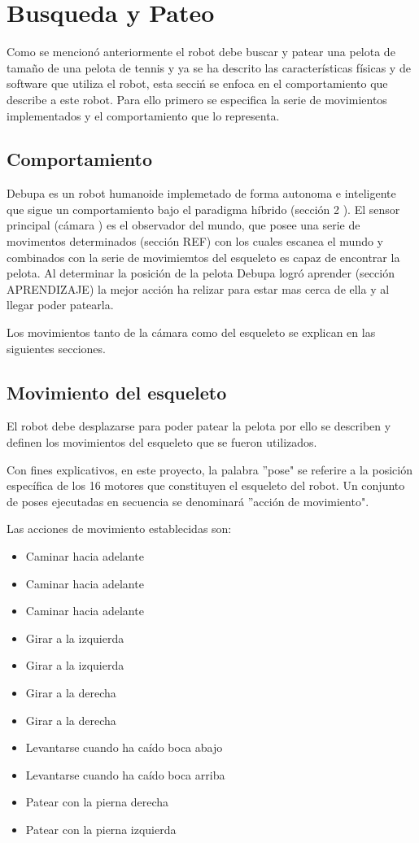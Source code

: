 \section{Busqueda y Pateo}
Como se mencion\'o anteriormente el robot debe buscar y patear una pelota de tamaño de una pelota de tennis y ya se ha descrito las caracter\'isticas f\'isicas y de software que utiliza el robot, esta secci\'n se enfoca en el comportamiento que describe a este robot.
 Para ello primero se especifica la serie de movimientos implementados y el comportamiento que lo representa.

\subsection{Comportamiento}

Debupa es un robot humanoide implemetado de forma autonoma e inteligente que sigue un comportamiento bajo el paradigma h\'ibrido (secci\'on 2 ). El sensor principal (c\'amara ) es el observador del mundo, que posee una serie de movimentos determinados (secci\'on REF) con los cuales escanea el mundo y combinados con la serie de movimiemtos del esqueleto es capaz de encontrar la pelota. Al determinar la posici\'on de la pelota Debupa logr\'o aprender (secci\'on APRENDIZAJE) la mejor acci\'on ha relizar para estar mas cerca de ella y al llegar poder patearla.

Los movimientos tanto de la c\'amara como del esqueleto se explican en las siguientes secciones.  

\subsection{Movimiento del esqueleto}
\label{esqueleto}
El robot debe desplazarse para poder patear la pelota por ello se describen y definen los movimientos del esqueleto que se fueron utilizados.

Con fines explicativos, en este proyecto, la palabra ''pose" se referire a la posición específica de los 16 motores que constituyen el esqueleto del robot. Un conjunto de poses ejecutadas en secuencia se denominará ''acción de movimiento".


Las acciones de movimiento establecidas son:


\begin{itemize}
 \item {Caminar hacia adelante}
 \item {Caminar hacia adelante}
 \item {Caminar hacia adelante}
 \item {Girar a la izquierda}
 \item {Girar a la izquierda} 
 \item {Girar a la derecha}
 \item {Girar a la derecha}	 
 \item {Levantarse cuando ha caído boca abajo}
 \item {Levantarse cuando ha caído boca arriba}
 \item {Patear con la pierna derecha }
 \item {Patear con la pierna izquierda}
 
\end{itemize}

